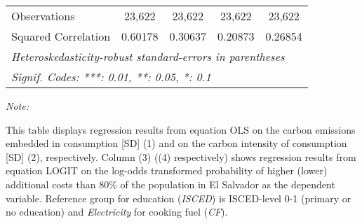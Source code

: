 \begin{table}[htbp!]
\begin{adjustbox}{width = 1\textwidth, max height = 0.95\textheight, center}
\begin{threeparttable}[b]
\begin{tabular}{lcccc}
            Observations         & 23,622             & 23,622             & 23,622        & 23,622\\  
            Squared Correlation  & 0.60178            & 0.30637            & 0.20873       & 0.26854\\  
            \midrule \midrule
            \multicolumn{5}{l}{\emph{Heteroskedasticity-robust standard-errors in parentheses}}\\
            \multicolumn{5}{l}{\emph{Signif. Codes: ***: 0.01, **: 0.05, *: 0.1}}\\
         \end{tabular}
         
         \begin{tablenotes}\item \medskip \textit{Note:}
            \item This table displays regression results from equation OLS on the carbon emissions embedded in consumption [SD] (1) and on the carbon intensity of consumption [SD] (2), respectively. 
                                      Column (3) ((4) respectively) shows regression results from equation LOGIT on the log-odds transformed probability of higher (lower) additional costs than 80\% of the population in El Salvador as the dependent variable. Reference group for education (\textit{ISCED}) is ISCED-level 0-1 (primary or no education) and \textit{Electricity} for cooking fuel (\textit{CF}).
         \end{tablenotes}
      \end{threeparttable}
   \end{adjustbox}
\end{table}



